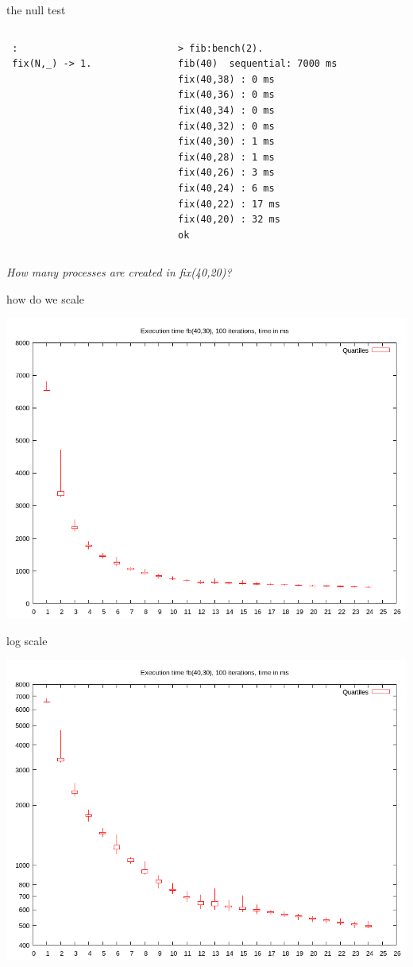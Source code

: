 \begin{frame}[fragile]{the null test}

\begin{columns}
\begin{column}{0.5\linewidth}
\begin{verbatim}
 :
 fix(N,_) -> 1.
\end{verbatim}
\end{column}
\pause
\begin{column}{0.5\linewidth}
\begin{verbatim}
> fib:bench(2).
fib(40)  sequential: 7000 ms
fix(40,38) : 0 ms
fix(40,36) : 0 ms
fix(40,34) : 0 ms
fix(40,32) : 0 ms
fix(40,30) : 1 ms
fix(40,28) : 1 ms
fix(40,26) : 3 ms
fix(40,24) : 6 ms
fix(40,22) : 17 ms
fix(40,20) : 32 ms
ok
\end{verbatim}
\end{column}
\end{columns}

\pause\vspace{20pt} 
{\em How many processes are created in fix(40,20)?}

\end{frame}

\begin{frame}{how do we scale}

\includegraphics[width=0.6\linewidth]{first.png}

\end{frame}

\begin{frame}{log scale}

\includegraphics[width=0.6\linewidth]{logy.png}

\end{frame}

